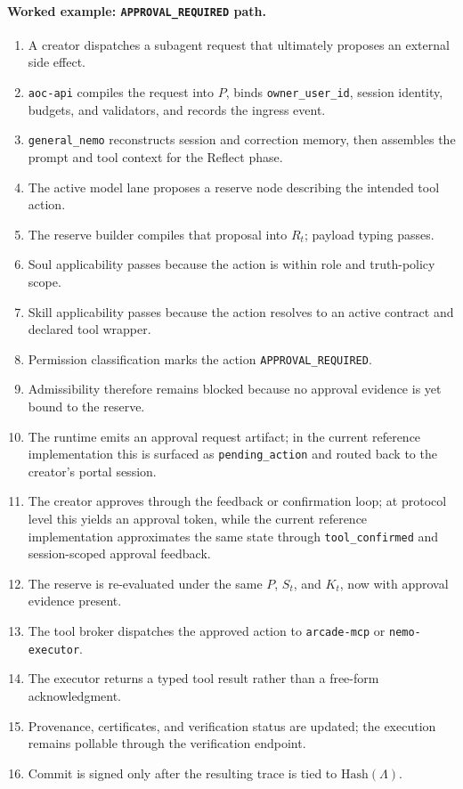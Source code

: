 \documentclass[11pt]{article}
\theoremstyle{remark}
\begin{document}
\paragraph{Worked example: \texttt{APPROVAL\_REQUIRED} path.}
\begin{enumerate}[leftmargin=1.5em]
    \item A creator dispatches a subagent request that ultimately proposes an external side effect.
    \item \texttt{aoc-api} compiles the request into \(P\), binds \texttt{owner\_user\_id}, session identity, budgets, and validators, and records the ingress event.
    \item \texttt{general\_nemo} reconstructs session and correction memory, then assembles the prompt and tool context for the Reflect phase.
    \item The active model lane proposes a reserve node describing the intended tool action.
    \item The reserve builder compiles that proposal into \(R_t\); payload typing passes.
    \item Soul applicability passes because the action is within role and truth-policy scope.
    \item Skill applicability passes because the action resolves to an active contract and declared tool wrapper.
    \item Permission classification marks the action \texttt{APPROVAL\_REQUIRED}.
    \item Admissibility therefore remains blocked because no approval evidence is yet bound to the reserve.
    \item The runtime emits an approval request artifact; in the current reference implementation this is surfaced as \texttt{pending\_action} and routed back to the creator's portal session.
    \item The creator approves through the feedback or confirmation loop; at protocol level this yields an approval token, while the current reference implementation approximates the same state through \texttt{tool\_confirmed} and session-scoped approval feedback.
    \item The reserve is re-evaluated under the same \(P\), \(S_t\), and \(K_t\), now with approval evidence present.
    \item The tool broker dispatches the approved action to \texttt{arcade-mcp} or \texttt{nemo-executor}.
    \item The executor returns a typed tool result rather than a free-form acknowledgment.
    \item Provenance, certificates, and verification status are updated; the execution remains pollable through the verification endpoint.
    \item Commit is signed only after the resulting trace is tied to \(\mathrm{Hash}(\Lambda)\).
\end{enumerate}
\end{document}
